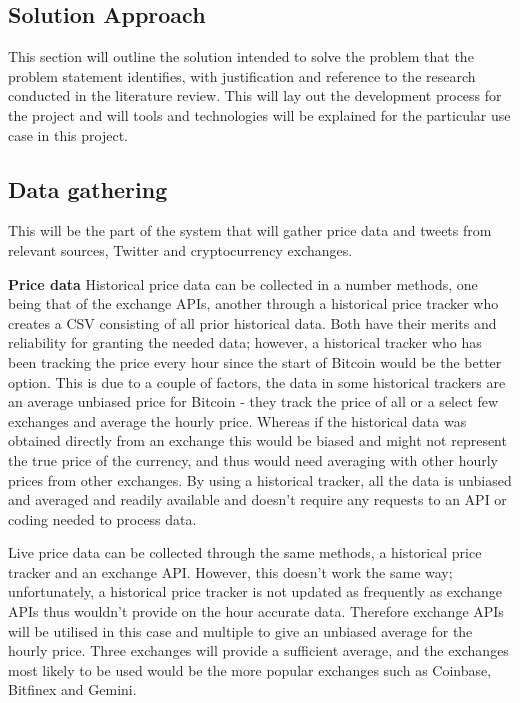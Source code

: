 \documentclass[oneside, 12pt]{article}
\begin{document}
	\newpage
	
	\begin{center}
		\section{Solution Approach}\label{solution}
	\end{center}
		This section will outline the solution intended to solve the problem that the problem statement identifies, with justification and reference to the research conducted in the literature review. This will lay out the development process for the project and will tools and technologies will be explained for the particular use case in this project.
		\newline
		
		\subsection{Data gathering}
		This will be the part of the system that will gather price data and tweets from relevant sources, Twitter and cryptocurrency exchanges.
		\newline
		
		\textbf{Price data}
		\newline
		\newline
		Historical price data can be collected in a number methods, one being that of the exchange APIs, another through a historical price tracker who creates a CSV consisting of all prior historical data. Both have their merits and reliability for granting the needed data; however, a historical tracker who has been tracking the price every hour since the start of Bitcoin would be the better option. This is due to a couple of factors, the data in some historical trackers are an average unbiased price for Bitcoin - they track the price of all or a select few exchanges and average the hourly price. Whereas if the historical data was obtained directly from an exchange this would be biased and might not represent the true price of the currency, and thus would need averaging with other hourly prices from other exchanges. By using a historical tracker, all the data is unbiased and averaged and readily available and doesn't require any requests to an API or coding needed to process data.
		
		Live price data can be collected through the same methods, a historical price tracker and an exchange API. However, this doesn't work the same way; unfortunately, a historical price tracker is not updated as frequently as exchange APIs thus wouldn't provide on the hour accurate data. Therefore exchange APIs will be utilised in this case and multiple to give an unbiased average for the hourly price. Three exchanges will provide a sufficient average, and the exchanges most likely to be used would be the more popular exchanges such as Coinbase, Bitfinex and Gemini.
		\newline
		
\end{document}
